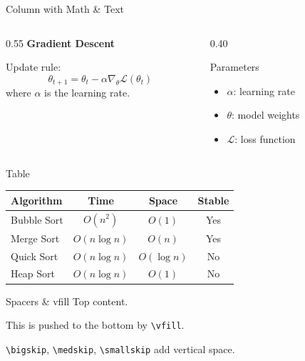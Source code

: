 \documentclass[aspectratio=169]{beamer}
\begin{document}
\begin{frame}{Column with Math \& Text}
  \begin{columns}
    \begin{column}{0.55\textwidth}
      \textbf{Gradient Descent}

      Update rule:
      \[
        \theta_{t+1} = \theta_t - \alpha \nabla_\theta \mathcal{L}(\theta_t)
      \]
      where $\alpha$ is the learning rate.
    \end{column}
    \begin{column}{0.40\textwidth}
      \begin{block}{Parameters}
        \begin{itemize}
          \item $\alpha$: learning rate
          \item $\theta$: model weights
          \item $\mathcal{L}$: loss function
        \end{itemize}
      \end{block}
    \end{column}
  \end{columns}
\end{frame}

\begin{frame}{Table}
  \centering
  \begin{tabular}{lccc}
    \toprule
    Algorithm    & Time     & Space  & Stable \\
    \midrule
    Bubble Sort  & $O(n^2)$ & $O(1)$ & Yes    \\
    Merge Sort   & $O(n \log n)$ & $O(n)$ & Yes \\
    Quick Sort   & $O(n \log n)$ & $O(\log n)$ & No \\
    Heap Sort    & $O(n \log n)$ & $O(1)$ & No \\
    \bottomrule
  \end{tabular}
\end{frame}

\begin{frame}{Spacers \& vfill}
  Top content.

  \vfill

  This is pushed to the bottom by \texttt{\textbackslash vfill}.

  \bigskip

  \texttt{\textbackslash bigskip}, \texttt{\textbackslash medskip}, \texttt{\textbackslash smallskip} add vertical space.
\end{frame}
\end{document}
